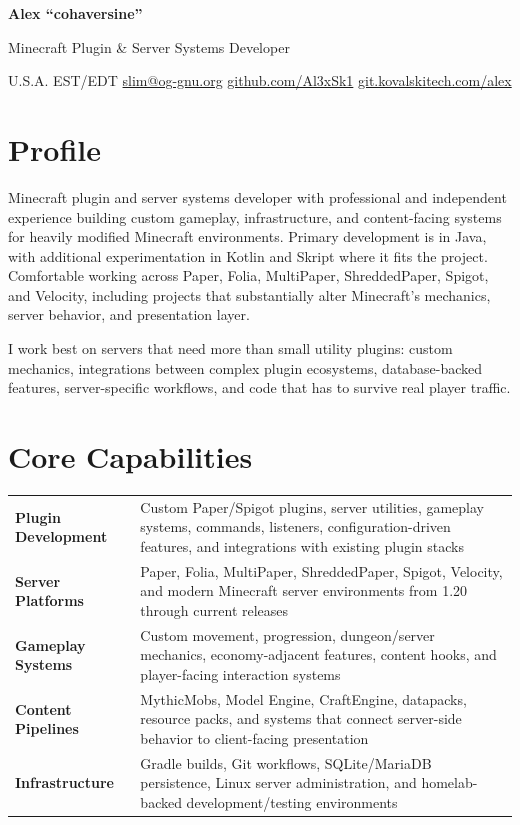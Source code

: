 \documentclass[10pt,letterpaper]{article}
\begin{document}
{\LARGE\bfseries Alex ``cohaversine''}

\vspace{3pt}
{\large Minecraft Plugin \& Server Systems Developer}

\vspace{5pt}
U.S.A. \textbullet{} EST/EDT \quad
\href{mailto:slim@og-gnu.org}{slim@og-gnu.org} \quad
\href{https://github.com/Al3xSk1}{github.com/Al3xSk1} \quad
\href{https://git.kovalskitech.com/alex}{git.kovalskitech.com/alex}

\section{Profile}

Minecraft plugin and server systems developer with professional and independent
experience building custom gameplay, infrastructure, and content-facing systems
for heavily modified Minecraft environments. Primary development is in Java,
with additional experimentation in Kotlin and Skript where it fits the project.
Comfortable working across Paper, Folia, MultiPaper, ShreddedPaper, Spigot, and
Velocity, including projects that substantially alter Minecraft's mechanics,
server behavior, and presentation layer.

I work best on servers that need more than small utility plugins: custom
mechanics, integrations between complex plugin ecosystems, database-backed
features, server-specific workflows, and code that has to survive real player
traffic.

\section{Core Capabilities}

\begin{tabularx}{\textwidth}{@{}lX@{}}
\textbf{Plugin Development} &
Custom Paper/Spigot plugins, server utilities, gameplay systems, commands,
listeners, configuration-driven features, and integrations with existing
plugin stacks \\[2pt]
\textbf{Server Platforms} &
Paper, Folia, MultiPaper, ShreddedPaper, Spigot, Velocity, and modern
Minecraft server environments from 1.20 through current releases \\[2pt]
\textbf{Gameplay Systems} &
Custom movement, progression, dungeon/server mechanics, economy-adjacent
features, content hooks, and player-facing interaction systems \\[2pt]
\textbf{Content Pipelines} &
MythicMobs, Model Engine, CraftEngine, datapacks, resource packs, and systems
that connect server-side behavior to client-facing presentation \\[2pt]
\textbf{Infrastructure} &
Gradle builds, Git workflows, SQLite/MariaDB persistence, Linux server
administration, and homelab-backed development/testing environments
\end{tabularx}
\end{document}
